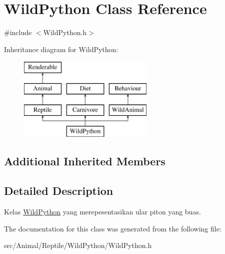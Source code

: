 \hypertarget{classWildPython}{\section{Wild\+Python Class Reference}
\label{classWildPython}
}


{\ttfamily \#include $<$Wild\+Python.\+h$>$}

Inheritance diagram for Wild\+Python\+:\begin{figure}[H]
\begin{center}
\leavevmode
\includegraphics[height=4.000000cm]{classWildPython}
\end{center}
\end{figure}
\subsection*{Additional Inherited Members}


\subsection{Detailed Description}
Kelas \hyperlink{classWildPython}{Wild\+Python} yang merepesentasikan ular piton yang buas. 

The documentation for this class was generated from the following file\+:\begin{DoxyCompactItemize}
\item 
src/\+Animal/\+Reptile/\+Wild\+Python/Wild\+Python.\+h\end{DoxyCompactItemize}
